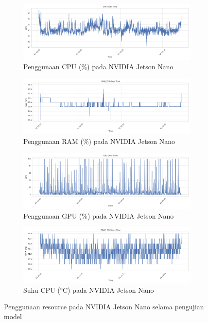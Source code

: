 \begin{figure}[htbp]
  \centering
  \begin{subfigure}[b]{0.9\textwidth}
    \includegraphics[width=\textwidth]{gambar/bab4-jetson-cpu-over-time.png}
    \caption{Penggunaan CPU (\%) pada NVIDIA Jetson Nano}
  \end{subfigure}
  
  \begin{subfigure}[b]{0.9\textwidth}
    \includegraphics[width=\textwidth]{gambar/bab4-jetson-ram-sys-over-time.png}
    \caption{Penggunaan RAM (\%) pada NVIDIA Jetson Nano}
  \end{subfigure}
  
  \begin{subfigure}[b]{0.9\textwidth}
    \includegraphics[width=\textwidth]{gambar/bab4-jetson-gpu-over-time.png}
    \caption{Penggunaan GPU (\%) pada NVIDIA Jetson Nano}
  \end{subfigure}
  
  \begin{subfigure}[b]{0.9\textwidth}
    \includegraphics[width=\textwidth]{gambar/bab4-jetson-temp-cpu-over-time.png}
    \caption{Suhu CPU (°C) pada NVIDIA Jetson Nano}
  \end{subfigure}
  
  \caption{Penggunaan resource pada NVIDIA Jetson Nano selama pengujian model}
  \label{fig:jetson_resource_usage}
\end{figure}

